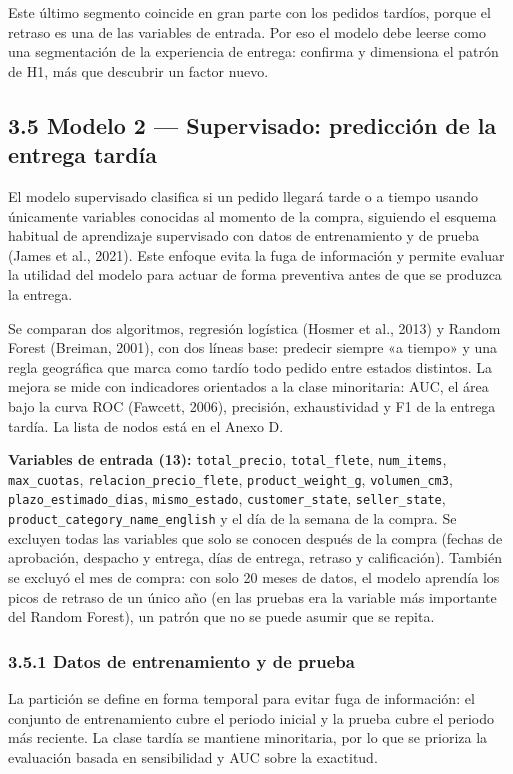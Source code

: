 \documentclass[a4paper,stu,12pt,donotrepeattitle,floatsintext]{apa7}
\begin{document}
Este último segmento coincide en gran parte con los pedidos tardíos, porque el retraso es una de las variables de entrada. Por eso el modelo debe leerse como una segmentación de la experiencia de entrega: confirma y dimensiona el patrón de H1, más que descubrir un factor nuevo.

\subsection{3.5 Modelo 2 — Supervisado: predicción de la entrega tardía}
El modelo supervisado clasifica si un pedido llegará tarde o a tiempo usando únicamente variables conocidas al momento de la compra, siguiendo el esquema habitual de aprendizaje supervisado con datos de entrenamiento y de prueba (James et al., 2021). Este enfoque evita la fuga de información y permite evaluar la utilidad del modelo para actuar de forma preventiva antes de que se produzca la entrega.

Se comparan dos algoritmos, regresión logística (Hosmer et al., 2013) y Random Forest (Breiman, 2001), con dos líneas base: predecir siempre «a tiempo» y una regla geográfica que marca como tardío todo pedido entre estados distintos. La mejora se mide con indicadores orientados a la clase minoritaria: AUC, el área bajo la curva ROC (Fawcett, 2006), precisión, exhaustividad y F1 de la entrega tardía. La lista de nodos está en el Anexo D.

\textbf{Variables de entrada (13):} \texttt{total\_\allowbreak{}precio}, \texttt{total\_\allowbreak{}flete}, \texttt{num\_\allowbreak{}items}, \texttt{max\_\allowbreak{}cuotas}, \texttt{relacion\_\allowbreak{}precio\_\allowbreak{}flete}, \texttt{product\_\allowbreak{}weight\_\allowbreak{}g}, \texttt{volumen\_\allowbreak{}cm3}, \texttt{plazo\_\allowbreak{}estimado\_\allowbreak{}dias}, \texttt{mismo\_\allowbreak{}estado}, \texttt{customer\_\allowbreak{}state}, \texttt{seller\_\allowbreak{}state}, \texttt{product\_\allowbreak{}category\_\allowbreak{}name\_\allowbreak{}english} y el día de la semana de la compra. Se excluyen todas las variables que solo se conocen después de la compra (fechas de aprobación, despacho y entrega, días de entrega, retraso y calificación). También se excluyó el mes de compra: con solo 20 meses de datos, el modelo aprendía los picos de retraso de un único año (en las pruebas era la variable más importante del Random Forest), un patrón que no se puede asumir que se repita.

\subsubsection{3.5.1 Datos de entrenamiento y de prueba}
La partición se define en forma temporal para evitar fuga de información: el conjunto de entrenamiento cubre el periodo inicial y la prueba cubre el periodo más reciente. La clase tardía se mantiene minoritaria, por lo que se prioriza la evaluación basada en sensibilidad y AUC sobre la exactitud.
\end{document}
